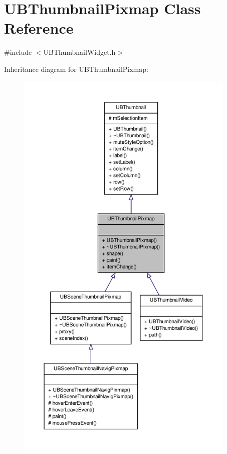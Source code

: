 \hypertarget{class_u_b_thumbnail_pixmap}{\section{U\-B\-Thumbnail\-Pixmap Class Reference}
\label{dd/d35/class_u_b_thumbnail_pixmap}
}


{\ttfamily \#include $<$U\-B\-Thumbnail\-Widget.\-h$>$}



Inheritance diagram for U\-B\-Thumbnail\-Pixmap\-:
\nopagebreak
\begin{figure}[H]
\begin{center}
\leavevmode
\includegraphics[height=550pt]{d5/d1d/class_u_b_thumbnail_pixmap__inherit__graph}
\end{center}
\end{figure}


